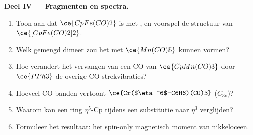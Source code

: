 \begin{problem}
\medskip\noindent\textbf{Deel IV --- Fragmenten en spectra.}
\begin{enumerate}[resume]
  \item Toon aan dat $\ce{CpFe(CO)2}$  is met , en voorspel de structuur van
        $\ce{[CpFe(CO)2]2}$.
  \item Welk gemengd dimeer zou het met $\ce{Mn(CO)5}$ kunnen vormen?
  \item Hoe verandert het vervangen van een CO van $\ce{CpMn(CO)3}$ door $\ce{PPh3}$ de overige
        CO-strekvibraties?
  \item Hoeveel CO-banden vertoont $\ce{Cr($\eta^6$-C6H6)(CO)3}$ ($C_{3v}$)?
  \item Waarom kan een ring $\eta^5$-Cp tijdens een substitutie naar $\eta^3$ verglijden?
  \item Formuleer het resultaat: het spin-only magnetisch moment van
        nikkeloceen.
\end{enumerate}
\end{problem}
